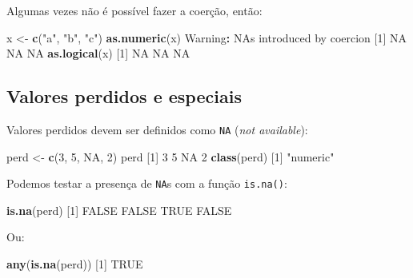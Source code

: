 \documentclass[10pt,a4paper]{book}
\newenvironment{Shaded}{\begin{snugshade}}{\end{snugshade}}
\newcommand{\KeywordTok}[1]{\textcolor[rgb]{0.13,0.29,0.53}{\textbf{#1}}}
\newcommand{\DecValTok}[1]{\textcolor[rgb]{0.00,0.00,0.81}{#1}}
\newcommand{\StringTok}[1]{\textcolor[rgb]{0.31,0.60,0.02}{#1}}
\newcommand{\OtherTok}[1]{\textcolor[rgb]{0.56,0.35,0.01}{#1}}
\newcommand{\OperatorTok}[1]{\textcolor[rgb]{0.81,0.36,0.00}{\textbf{#1}}}
\newcommand{\NormalTok}[1]{#1}
\begin{document}
Algumas vezes não é possível fazer a coerção, então:

\begin{Shaded}
\begin{Highlighting}[]
\NormalTok{x <-}\StringTok{ }\KeywordTok{c}\NormalTok{(}\StringTok{"a"}\NormalTok{, }\StringTok{"b"}\NormalTok{, }\StringTok{"c"}\NormalTok{)}
\KeywordTok{as.numeric}\NormalTok{(x)}
\NormalTok{Warning}\OperatorTok{:}\StringTok{ }\NormalTok{NAs introduced by coercion}
\NormalTok{[}\DecValTok{1}\NormalTok{] }\OtherTok{NA} \OtherTok{NA} \OtherTok{NA}
\KeywordTok{as.logical}\NormalTok{(x)}
\NormalTok{[}\DecValTok{1}\NormalTok{] }\OtherTok{NA} \OtherTok{NA} \OtherTok{NA}
\end{Highlighting}
\end{Shaded}

\subsection{Valores perdidos e
especiais}\label{valores-perdidos-e-especiais}

Valores perdidos devem ser definidos como \texttt{NA} (\emph{not
available}):

\begin{Shaded}
\begin{Highlighting}[]
\NormalTok{perd <-}\StringTok{ }\KeywordTok{c}\NormalTok{(}\DecValTok{3}\NormalTok{, }\DecValTok{5}\NormalTok{, }\OtherTok{NA}\NormalTok{, }\DecValTok{2}\NormalTok{)}
\NormalTok{perd}
\NormalTok{[}\DecValTok{1}\NormalTok{]  }\DecValTok{3}  \DecValTok{5} \OtherTok{NA}  \DecValTok{2}
\KeywordTok{class}\NormalTok{(perd)}
\NormalTok{[}\DecValTok{1}\NormalTok{] }\StringTok{"numeric"}
\end{Highlighting}
\end{Shaded}

Podemos testar a presença de \texttt{NA}s com a função \texttt{is.na()}:

\begin{Shaded}
\begin{Highlighting}[]
\KeywordTok{is.na}\NormalTok{(perd)}
\NormalTok{[}\DecValTok{1}\NormalTok{] }\OtherTok{FALSE} \OtherTok{FALSE}  \OtherTok{TRUE} \OtherTok{FALSE}
\end{Highlighting}
\end{Shaded}

Ou:

\begin{Shaded}
\begin{Highlighting}[]
\KeywordTok{any}\NormalTok{(}\KeywordTok{is.na}\NormalTok{(perd))}
\NormalTok{[}\DecValTok{1}\NormalTok{] }\OtherTok{TRUE}
\end{Highlighting}
\end{Shaded}
\end{document}
